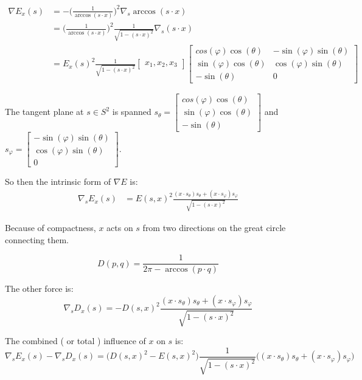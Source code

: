 \documentclass[10pt]{article}
\begin{document}
\begin{align*}
	\nabla E_{x}(s) &= - \Big( \frac{1}{\arccos(s \cdot x)} \Big)^2 \nabla_s \arccos(s \cdot x) \\
						  &=  \Big( \frac{1}{\arccos(s \cdot x)} \Big)^2 \frac{1}{\sqrt{1 -  (s \cdot x)^2 }} \nabla_s (s \cdot x)\\
						  &=  E_{x}(s)^{2} \frac{1}{\sqrt{1 -  (s \cdot x)^2 }}
\left[
\begin{array}{ccc}
x_1, x_2, x_3
\end{array}
\right]
\left[
	\begin{array}{cc}
		cos(\varphi) \cos(\theta) & -\sin(\varphi) \sin(\theta) \\
		  \sin(\varphi)\cos(\theta) & \cos(\varphi)\sin(\theta)  \\
		-\sin(\theta) & 0 
	\end{array}
	\right]
\end{align*}

The tangent plane at $s \in S^2$ is spanned $s_{\theta} = 	\left[\begin{array}{cc}
		cos(\varphi) \cos(\theta)  \\
		  \sin(\varphi)\cos(\theta)  \\
		-\sin(\theta)  
	\end{array}\right]$
and $ s_{\varphi} = \left[
	\begin{array}{cc}
		-\sin(\varphi) \sin(\theta) \\
		  \cos(\varphi)\sin(\theta)  \\
		 0 
	\end{array}
	\right]$.

So then the intrinsic form of $\nabla E$ is:
\begin{align*}
\nabla_{s} E_{x}(s)  &=  E(s, x)^{2} \frac{(x \cdot s_{\theta}) s_{\theta} + (x \cdot s_{\varphi}) s_{\varphi}}{\sqrt{ 1 -  (s \cdot x)^2 }} 
\end{align*}

Because of compactness, $x$ acts on $s$ from two directions on the great circle connecting them.

\[
		D(p,q) = \frac{1}{2\pi - \arccos(p \cdot q)}
\]

 The other force is:
\[
\nabla_{s} D_{x}(s) =  - D(s, x)^{2} \frac{(x \cdot s_{\theta}) s_{\theta} + (x \cdot s_{\varphi}) s_{\varphi}}{\sqrt{1 - (s \cdot x)^2 }} 
\]

The combined ( or total ) influence of $x$ on $s$ is:
\[
	\nabla_s E_x(s)  - \nabla_{s} D_{x}(s) = \Big(D(s, x)^{2} - E(s, x)^{2} \Big) \frac{1}{\sqrt{1 -  (s \cdot x)^2 }} \Big( (x \cdot s_{\theta}) s_{\theta} + (x \cdot s_{\varphi}) s_{\varphi} \Big)
\]
 
\end{document}
